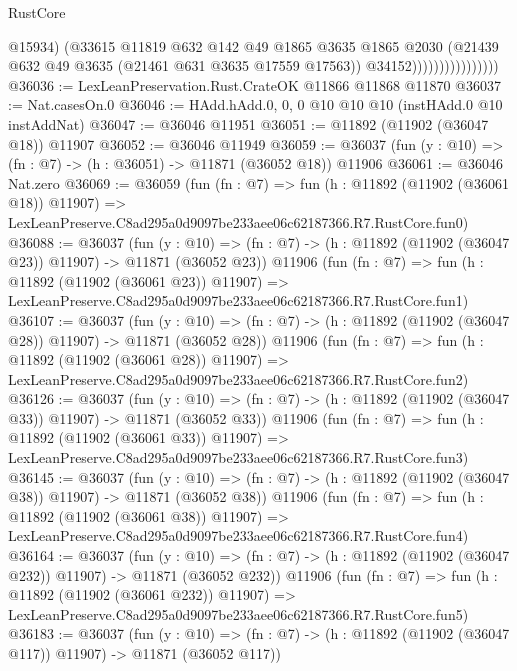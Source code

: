 \begin{lexlean}{RustCore}
\begin{coremodule}
                                    @15934)
                                  (@33615
                                    @11819
                                    @632
                                    @142
                                    @49
                                    @1865
                                    @3635
                                    @1865
                                    @2030
                                    (@21439 @632 @49 @3635 (@21461 @631 @3635 @17559 @17563))
                                    @34152))))))))))))))))
@36036 := LexLeanPreservation.Rust.CrateOK @11866 @11868 @11870
@36037 := Nat.casesOn.{0}
@36046 := HAdd.hAdd.{0, 0, 0} @10 @10 @10 (instHAdd.{0} @10 instAddNat)
@36047 := @36046 @11951
@36051 := @11892 (@11902 (@36047 @18)) @11907
@36052 := @36046 @11949
@36059 := @36037 (fun (y : @10) => (fn : @7) -> (h : @36051) -> @11871 (@36052 @18)) @11906
@36061 := @36046 Nat.zero
@36069 := @36059
    (fun (fn : @7) =>
    fun (h : @11892 (@11902 (@36061 @18)) @11907) =>
    LexLeanPreserve.C8ad295a0d9097be233aee06c62187366.R7.RustCore.fun0)
@36088 := @36037
    (fun (y : @10) => (fn : @7) -> (h : @11892 (@11902 (@36047 @23)) @11907) -> @11871 (@36052 @23))
    @11906
    (fun (fn : @7) =>
    fun (h : @11892 (@11902 (@36061 @23)) @11907) =>
    LexLeanPreserve.C8ad295a0d9097be233aee06c62187366.R7.RustCore.fun1)
@36107 := @36037
    (fun (y : @10) => (fn : @7) -> (h : @11892 (@11902 (@36047 @28)) @11907) -> @11871 (@36052 @28))
    @11906
    (fun (fn : @7) =>
    fun (h : @11892 (@11902 (@36061 @28)) @11907) =>
    LexLeanPreserve.C8ad295a0d9097be233aee06c62187366.R7.RustCore.fun2)
@36126 := @36037
    (fun (y : @10) => (fn : @7) -> (h : @11892 (@11902 (@36047 @33)) @11907) -> @11871 (@36052 @33))
    @11906
    (fun (fn : @7) =>
    fun (h : @11892 (@11902 (@36061 @33)) @11907) =>
    LexLeanPreserve.C8ad295a0d9097be233aee06c62187366.R7.RustCore.fun3)
@36145 := @36037
    (fun (y : @10) => (fn : @7) -> (h : @11892 (@11902 (@36047 @38)) @11907) -> @11871 (@36052 @38))
    @11906
    (fun (fn : @7) =>
    fun (h : @11892 (@11902 (@36061 @38)) @11907) =>
    LexLeanPreserve.C8ad295a0d9097be233aee06c62187366.R7.RustCore.fun4)
@36164 := @36037
    (fun (y : @10) =>
    (fn : @7) -> (h : @11892 (@11902 (@36047 @232)) @11907) -> @11871 (@36052 @232))
    @11906
    (fun (fn : @7) =>
    fun (h : @11892 (@11902 (@36061 @232)) @11907) =>
    LexLeanPreserve.C8ad295a0d9097be233aee06c62187366.R7.RustCore.fun5)
@36183 := @36037
    (fun (y : @10) =>
    (fn : @7) -> (h : @11892 (@11902 (@36047 @117)) @11907) -> @11871 (@36052 @117))

\end{coremodule}
\end{lexlean}
